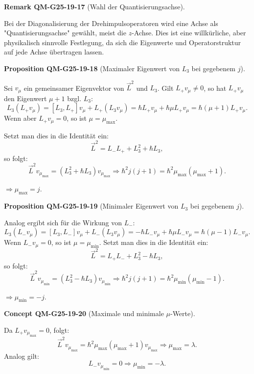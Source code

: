 \documentclass[10pt, letterpaper]{article}
\newcommand{\CustomHeading}[3]{%
  \par\medskip\noindent%
  \textbf{#1 #2} \textnormal{(#3)}.\enskip%
}
\newenvironment{PROP}[2]{\CustomHeading{Proposition}{#1}{#2}}{}
\newenvironment{REM}[2]{\CustomHeading{Remark}{#1}{#2}}{}
\newenvironment{CONC}[2]{\CustomHeading{Concept}{#1}{#2}}{}
\begin{document}
\begin{REM}{QM-G25-19-17}{Wahl der Quantisierungsachse}
Bei der Diagonalisierung der Drehimpulsoperatoren wird eine Achse als "Quantisierungsachse" gewählt, meist die \(z\)-Achse. Dies ist eine willkürliche, aber physikalisch sinnvolle Festlegung, da sich die Eigenwerte und Operatorstruktur auf jede Achse übertragen lassen.
\end{REM}

\begin{PROP}{QM-G25-19-18}{Maximaler Eigenwert von \(L_3\) bei gegebenem \(j\)}
Sei \(v_\mu\) ein gemeinsamer Eigenvektor von \(\vec{L}^2\) und \(L_3\). Gilt \(L_+ v_\mu \neq 0\), so hat \(L_+ v_\mu\) den Eigenwert \(\mu + 1\) bzgl. \(L_3\):
$$
L_3 (L_+ v_\mu) = [L_3, L_+] v_\mu + L_+ (L_3 v_\mu)
= \hbar L_+ v_\mu + \hbar \mu L_+ v_\mu = \hbar (\mu + 1) L_+ v_\mu.
$$
Wenn aber \(L_+ v_\mu = 0\), so ist \(\mu = \mu_{\max}\).

Setzt man dies in die Identität ein:
$$
\vec{L}^2 = L_- L_+ + L_3^2 + \hbar L_3,
$$
so folgt:
$$
\vec{L}^2 v_{\mu_{\max}} = \left(L_3^2 + \hbar L_3\right) v_{\mu_{\max}}
\Rightarrow \hbar^2 j(j+1) = \hbar^2 \mu_{\max} (\mu_{\max} + 1).
$$

\(\Rightarrow \mu_{\max} = j\).
\end{PROP}

\begin{PROP}{QM-G25-19-19}{Minimaler Eigenwert von \(L_3\) bei gegebenem \(j\)}
Analog ergibt sich für die Wirkung von \(L_-\):
$$
L_3 (L_- v_\mu) = [L_3, L_-] v_\mu + L_- (L_3 v_\mu)
= -\hbar L_- v_\mu + \hbar \mu L_- v_\mu = \hbar (\mu - 1) L_- v_\mu.
$$
Wenn \(L_- v_\mu = 0\), so ist \(\mu = \mu_{\min}\). Setzt man dies in die Identität ein:
$$
\vec{L}^2 = L_+ L_- + L_3^2 - \hbar L_3,
$$
so folgt:
$$
\vec{L}^2 v_{\mu_{\min}} = \left(L_3^2 - \hbar L_3\right) v_{\mu_{\min}}
\Rightarrow \hbar^2 j(j+1) = \hbar^2 \mu_{\min} (\mu_{\min} - 1).
$$

\(\Rightarrow \mu_{\min} = -j\).
\end{PROP}

\begin{CONC}{QM-G25-19-20}{Maximale und minimale \(\mu\)-Werte}
Da \(L_+ v_{\mu_{\text{max}}} = 0\), folgt:
$$
\vec{L}^2 v_{\mu_{\text{max}}} = \hbar^2 \mu_{\text{max}} (\mu_{\text{max}} + 1) v_{\mu_{\text{max}}}
\Rightarrow \mu_{\text{max}} = \lambda.
$$
Analog gilt:
$$
L_- v_{\mu_{\text{min}}} = 0 \Rightarrow \mu_{\text{min}} = -\lambda.
$$
\end{CONC}
\end{document}

